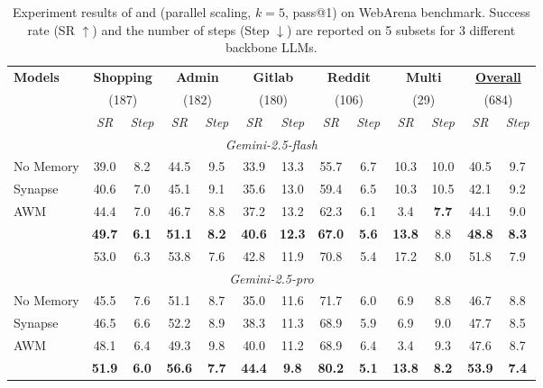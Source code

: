 \begin{table}[t]
\centering\setlength{\tabcolsep}{5.3pt}
\small
\setlength{\belowcaptionskip}{6.0pt}
  \caption{Experiment results of \ours{} and \mats{} (parallel scaling, $k=5$, pass@1) on WebArena benchmark. Success rate (SR $\uparrow$) and the number of steps (Step $\downarrow$) are reported on 5 subsets for 3 different backbone LLMs.}
  \label{table: webarena}
  \begin{tabular}{lcccccccccccc}
    \toprule
    \multirow{2}{*}{\textbf{Models}} &\multicolumn{2}{c}{\textbf{Shopping}}&\multicolumn{2}{c}{\textbf{Admin}}&\multicolumn{2}{c}{\textbf{Gitlab}}&\multicolumn{2}{c}{\textbf{Reddit}}&\multicolumn{2}{c}{\textbf{Multi}}&\multicolumn{2}{c}{\textbf{\underline{Overall}}}\\
    &\multicolumn{2}{c}{(187)}&\multicolumn{2}{c}{(182)} &\multicolumn{2}{c}{(180)} & \multicolumn{2}{c}{(106)}&\multicolumn{2}{c}{(29)}&\multicolumn{2}{c}{(684)}\\
\cmidrule(lr){2-3}\cmidrule(lr){4-5}\cmidrule(lr){6-7}\cmidrule(lr){8-9}\cmidrule(lr){10-11}\cmidrule(lr){12-13}
&\textit{SR}&\textit{Step}&\textit{SR}&\textit{Step}&\textit{SR}&\textit{Step}&\textit{SR}&\textit{Step}&\textit{SR}&\textit{Step}&\textit{SR}&\textit{Step} \\
    \midrule
    \multicolumn{13}{c}{\cellcolor{gray!15}\textit{Gemini-2.5-flash}} \\
    No Memory &39.0&8.2&44.5&9.5&33.9&13.3&55.7&6.7&10.3&10.0&40.5&9.7\\
    Synapse&40.6&7.0&45.1&9.1&35.6&13.0&59.4&6.5&10.3&10.5&42.1&9.2\\
    AWM&44.4&7.0&46.7&8.8&37.2&13.2&62.3&6.1&3.4&\textbf{7.7}&44.1&9.0\\
    \hdashline
    \ours{} &\textbf{49.7}&\textbf{6.1}&\textbf{51.1}&\textbf{8.2}&\textbf{40.6}&\textbf{12.3}&\textbf{67.0}&\textbf{5.6}&\textbf{13.8}&8.8&\textbf{48.8}&\textbf{8.3} \\
    \dab{+\mats{}} &53.0 & 6.3&53.8&7.6&42.8&11.9&70.8&5.4&17.2&8.0 &51.8&7.9\\
    \midrule
    \multicolumn{13}{c}{\cellcolor{gray!15}\textit{Gemini-2.5-pro}} \\
    No Memory&45.5&7.6&51.1&8.7&35.0&11.6&71.7&6.0&6.9&8.8&46.7&8.8\\
    Synapse&46.5&6.6&52.2&8.9&38.3&11.3&68.9&5.9&6.9&9.0&47.7&8.5\\
    AWM&48.1&6.4&49.3&9.8&40.0&11.2&68.9&6.4&3.4&9.3&47.6&8.7\\
    \hdashline
    \ours{} & \textbf{51.9}&\textbf{6.0}&\textbf{56.6}&\textbf{7.7}&\textbf{44.4}&\textbf{9.8}&\textbf{80.2}&\textbf{5.1}&\textbf{13.8}&\textbf{8.2}&\textbf{53.9}&\textbf{7.4}\\

\end{tabular}
\end{table}
